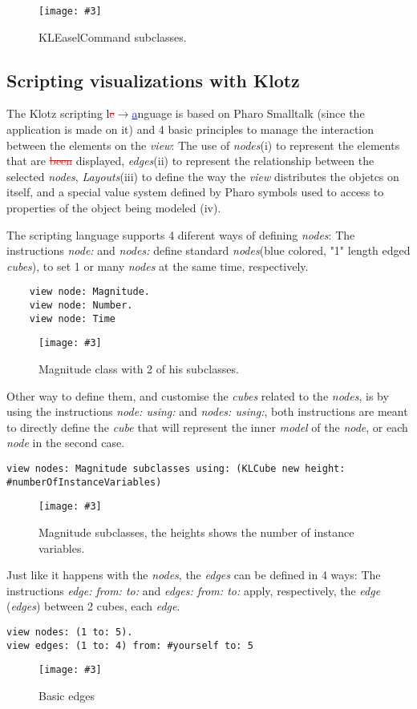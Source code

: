 \documentclass[runningheads]{llncs}
\newcommand{\ra}{$\rightarrow$}
\newcommand{\del}[1]{\textcolor{red}{\sout{#1}}} %
\newcommand{\chg}[2]{\textcolor{red}{\sout{#1}}{\ra}\textcolor{blue}{\uline{#2}}} %
\newcommand{\fig}[4]{
	\begin{figure}[#1]
		\centering
		\texttt{[image: \#3]}
		\caption{\label{fig:#3}#4}
	\end{figure}}
\newcommand{\seclabel}[1]{\label{sec:#1}}
\begin{document}
\fig{}{0.5}{figure1.png}{KLEaselCommand subclasses.}


\subsection{Scripting visualizations with Klotz} \seclabel{scripting}
The Klotz scripting l\chg{e}{a}nguage is based on Pharo Smalltalk
(since the application is made on it) and 4 basic principles
to manage the interaction between the elements on the \emph{view}:
The use of \emph{nodes}(i) to represent the elements that are \del{been}
displayed, \emph{edges}(ii) to represent the relationship between
the selected \emph{nodes}, \emph{Layouts}(iii) to define the way the
\emph{view} distributes the objetcs on itself, and a special value
system defined by Pharo symbols used to access to properties of
the object being modeled (iv).  

The scripting language supports 4 diferent ways of defining \emph{nodes}:
The instructions \emph{node:} and \emph{nodes:} define standard 
\emph{nodes}(blue colored, "1" length edged \emph{cubes}), to set 1 or many 
\emph{nodes} at the same time, respectively.
\begin{lstlisting}
	view node: Magnitude.
	view node: Number.
	view node: Time    
\end{lstlisting}
\fig{}{0.3}{figure2.png}{Magnitude class with 2 of his subclasses.}
Other way to define them, and customise the \emph{cubes} related to the 
\emph{nodes}, is by using the instructions \emph{node: using:} and 
\emph{nodes: using:}, both instructions are meant to directly define 
the \emph{cube} that will represent the inner \emph{model} of the \emph{node}, 
or each \emph{node} in the second case.
\begin{lstlisting}
view nodes: Magnitude subclasses using: (KLCube new height: #numberOfInstanceVariables)    
\end{lstlisting}
\fig{}{0.5}{figure3.png}{Magnitude subclasses, the heights shows the number of instance variables.}

Just like it happens with the \emph{nodes}, the \emph{edges} can be defined in 
4 ways: The instructions \emph{edge: from: to:} and \emph{edges: from: to:} 
apply, respectively, the \emph{edge} (\emph{edges}) between 2 cubes, each \emph{edge}.
\begin{lstlisting}
view nodes: (1 to: 5).	
view edges: (1 to: 4) from: #yourself to: 5 
\end{lstlisting}
\fig{}{0.5}{figure4.png}{Basic edges}
\end{document}
